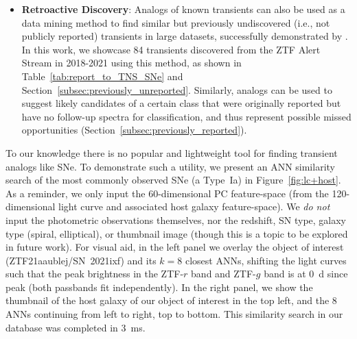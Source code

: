 \documentclass[twocolumn]{aastex63}
\begin{document}
\begin{itemize}
    \item \textbf{Retroactive Discovery}: Analogs of known transients can also be used as a data mining method to find similar but previously undiscovered (i.e., not publicly reported) transients in large datasets, successfully demonstrated by \cite{Aleo2022}. In this work, we showcase 84 transients discovered from the ZTF Alert Stream in 2018-2021 using this method, as shown in Table~\ref{tab:report_to_TNS_SNe} and Section~\ref{subsec:previously_unreported}. Similarly, analogs can be used to suggest likely candidates of a certain class that were originally reported but have no follow-up spectra for classification, and thus represent possible missed opportunities (Section~\ref{subsec:previously_reported}).
\end{itemize}


To our knowledge there is no popular and lightweight tool for finding transient analogs like SNe. To demonstrate such a utility, we present an ANN similarity search of the most commonly observed SNe (a Type~Ia) in Figure~\ref{fig:lc+host}. As a reminder, we only input the 60-dimensional PC feature-space (from the 120-dimensional light curve and associated host galaxy feature-space). We \emph{do not} input the photometric observations themselves, nor the redshift, SN type, galaxy type (spiral, elliptical), or thumbnail image (though this is a topic to be explored in future work). For visual aid, in the left panel we overlay the object of interest (ZTF21aaublej/SN~2021ixf) and its $k=8$ closest ANNs, shifting the light curves such that the peak brightness in the ZTF-$r$ band and ZTF-$g$ band is at 0~d since peak (both passbands fit independently). In the right panel, we show the thumbnail of the host galaxy of our object of interest in the top left, and the 8 ANNs continuing from left to right, top to bottom. This similarity search in our database was completed in 3~ms. \par
\end{document}
